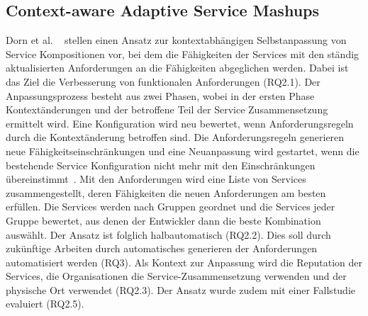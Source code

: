 \documentclass[conference,compsoc,ngerman]{IEEEtran}
\begin{document}
\subsection{Context-aware Adaptive Service Mashups}
Dorn et al. ~\cite{dorn2009context} stellen einen Ansatz zur kontextabhängigen Selbstanpassung von Service Kompositionen vor, bei dem die Fähigkeiten der Services mit den ständig aktualisierten Anforderungen an die Fähigkeiten abgeglichen werden. Dabei ist das Ziel die Verbesserung von funktionalen Anforderungen (RQ2.1). Der Anpassungsprozess besteht aus zwei Phasen, wobei in der ersten Phase Kontextänderungen und der betroffene Teil der Service Zusammensetzung ermittelt wird. Eine Konfiguration wird neu bewertet, wenn Anforderungsregeln durch die Kontextänderung betroffen sind. Die Anforderungsregeln generieren neue Fähigkeitseinschränkungen und eine Neuanpassung wird gestartet, wenn die bestehende Service Konfiguration nicht mehr mit den Einschränkungen übereinstimmt~\cite{dorn2009context}. Mit den Anforderungen wird eine Liste von Services zusammengestellt, deren Fähigkeiten die neuen Anforderungen am besten erfüllen. Die Services werden nach Gruppen geordnet und die Services jeder Gruppe bewertet, aus denen der Entwickler dann die beste Kombination auswählt. Der Ansatz ist folglich halbautomatisch (RQ2.2). Dies soll durch zukünftige Arbeiten durch automatisches generieren der Anforderungen automatisiert werden (RQ3).
Als Kontext zur Anpassung wird die Reputation der Services, die Organisationen die Service-Zusammensetzung verwenden und der physische Ort verwendet (RQ2.3).
Der Ansatz wurde zudem mit einer Fallstudie evaluiert (RQ2.5).
\end{document}
